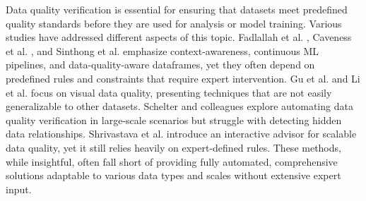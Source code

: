Data quality verification is essential for ensuring that datasets meet predefined quality standards before they are used for analysis or model training. Various studies have addressed different aspects of this topic. Fadlallah et al. \cite{fadlallah2023context}, Caveness et al. \cite{caveness2020tensorflow}, and Sinthong et al. \cite{sinthong2021dqdf} emphasize context-awareness, continuous ML pipelines, and data-quality-aware dataframes, yet they often depend on predefined rules and constraints that require expert intervention. Gu et al. \cite{bertino2018adaptive} and Li et al. \cite{li2022blindly} focus on visual data quality, presenting techniques that are not easily generalizable to other datasets. Schelter and colleagues \cite{schelter2018automating, schelter2019differential} explore automating data quality verification in large-scale scenarios but struggle with detecting hidden data relationships. Shrivastava et al. \cite{shrivastava2019dqa} introduce an interactive advisor for scalable data quality, yet it still relies heavily on expert-defined rules. These methods, while insightful, often fall short of providing fully automated, comprehensive solutions adaptable to various data types and scales without extensive expert input.



